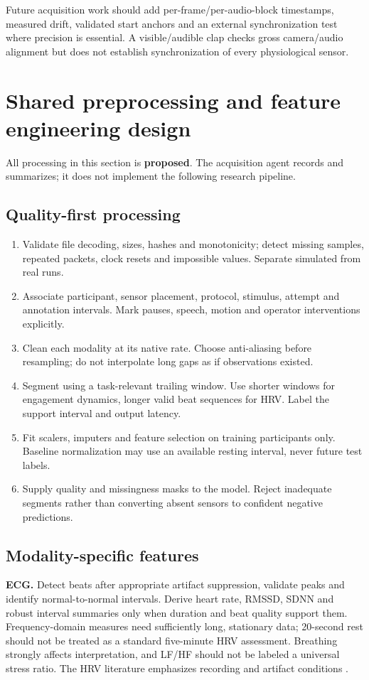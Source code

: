 \documentclass[11pt,a4paper]{article}
\begin{document}
Future acquisition work should add per-frame/per-audio-block timestamps, measured drift, validated start anchors and an external synchronization test where precision is essential. A visible/audible clap checks gross camera/audio alignment but does not establish synchronization of every physiological sensor.

\section{Shared preprocessing and feature engineering design}
All processing in this section is \textbf{proposed}. The acquisition agent records and summarizes; it does not implement the following research pipeline.

\subsection{Quality-first processing}
\begin{enumerate}
\item Validate file decoding, sizes, hashes and monotonicity; detect missing samples, repeated packets, clock resets and impossible values. Separate simulated from real runs.
\item Associate participant, sensor placement, protocol, stimulus, attempt and annotation intervals. Mark pauses, speech, motion and operator interventions explicitly.
\item Clean each modality at its native rate. Choose anti-aliasing before resampling; do not interpolate long gaps as if observations existed.
\item Segment using a task-relevant trailing window. Use shorter windows for engagement dynamics, longer valid beat sequences for HRV. Label the support interval and output latency.
\item Fit scalers, imputers and feature selection on training participants only. Baseline normalization may use an available resting interval, never future test labels.
\item Supply quality and missingness masks to the model. Reject inadequate segments rather than converting absent sensors to confident negative predictions.
\end{enumerate}

\subsection{Modality-specific features}
\textbf{ECG.} Detect beats after appropriate artifact suppression, validate peaks and identify normal-to-normal intervals. Derive heart rate, RMSSD, SDNN and robust interval summaries only when duration and beat quality support them. Frequency-domain measures need sufficiently long, stationary data; 20-second rest should not be treated as a standard five-minute HRV assessment. Breathing strongly affects interpretation, and LF/HF should not be labeled a universal stress ratio. The HRV literature emphasizes recording and artifact conditions \cite{hrv}.
\end{document}
